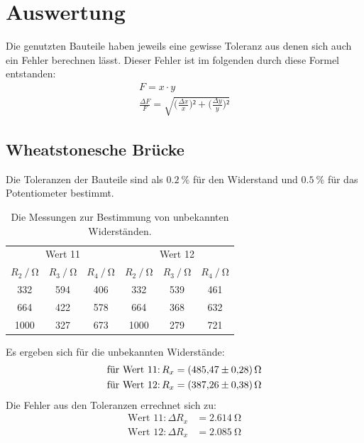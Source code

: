 \section{Auswertung}
\label{sec:Auswertung}
Die genutzten Bauteile haben jeweils eine gewisse Toleranz aus denen sich auch ein Fehler berechnen lässt. 
Dieser Fehler ist im folgenden durch diese Formel entstanden: 
\begin{gather*}
    F = x \cdot y \\
    \frac{\Delta F}{F} = \sqrt{\biggl(\frac{\Delta x}{x}\biggr)² + \biggl(\frac{\Delta y}{y}\biggr)²}
\end{gather*}

\subsection{Wheatstonesche Brücke}
Die Toleranzen der Bauteile sind als $\SI{0.2}{\percent}$ für den Widerstand und $\SI{0.5}{\percent}$ für das Potentiometer bestimmt.
\begin{table}
  \label{tab:wheatstone}
  \centering
  \caption{Die Messungen zur Bestimmung von unbekannten Widerständen.}
  \begin{tabular}{S[table-format=4.0]
                  S[table-format=3.0]
                  S[table-format=3.0]
                  S[table-format=4.0]
                  S[table-format=3.0]
                  S[table-format=3.0]}
      \toprule
       &  \\
      \cmidrule(lr){1-3} \cmidrule(lr){4-6}
      {$R_2 \mathbin{/} \si{\ohm}$} &
      {$R_3 \mathbin{/} \si{\ohm}$} &
      {$R_4 \mathbin{/} \si{\ohm}$} &
      {$R_2 \mathbin{/} \si{\ohm}$} &
      {$R_3 \mathbin{/} \si{\ohm}$} &
      {$R_4 \mathbin{/} \si{\ohm}$} \\
      \cmidrule(lr){1-3} \cmidrule(lr){4-6}
      332 & 594 & 406 & 332  & 539 & 461 \\
      664 & 422 & 578 & 664  & 368 & 632 \\
      1000& 327 & 673 & 1000 & 279 & 721 \\
      \bottomrule
  \end{tabular}  
\end{table}
Es ergeben sich für die unbekannten Widerstände:
\begin{align*}
  \text{für Wert 11:}\, R_x &= \SI{485.47 \pm 0.28}{\ohm}\\
  \text{für Wert 12:}\, R_x &= \SI{387.26 \pm 0.38}{\ohm}
\end{align*}
Die Fehler aus den Toleranzen errechnet sich zu:
\begin{align*}
  \text{Wert 11:}\, \Delta R_x &= \SI{2.614}{\ohm}\\
  \text{Wert 12:}\, \Delta R_x &= \SI{2.085}{\ohm}
\end{align*} 

